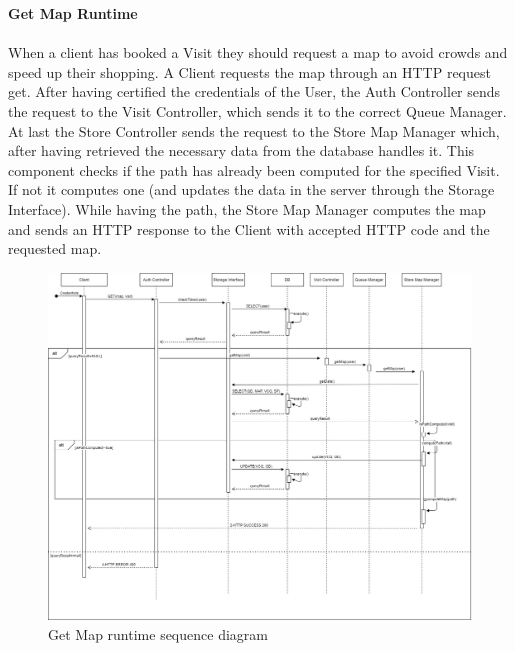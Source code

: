 \documentclass[a4paper, 12pt, oneside, table]{article}
\begin{document}
\textbf{Get Map Runtime}\\
\\
When a client has booked a Visit they should request a map to avoid crowds and speed up their shopping. 
A Client requests the map through an HTTP request get. After having certified the credentials of the User, the Auth Controller sends the request to the Visit Controller, which sends it to the correct Queue Manager. At last the Store Controller sends the request to the Store Map Manager which, after having retrieved the necessary data from the database handles it. This component checks if the path has already been computed for the specified Visit. If not it computes one (and updates the data in the server through the Storage Interface).  While having the path, the Store Map Manager computes the map and sends an HTTP response to the Client with accepted HTTP code and the requested map.
\begin{figure}[H]
\centering
    \centering
    \includegraphics[height=0.5\textheight, scale=0.5, keepaspectratio]{img/seq_diag/GetMap_RuntimeView.jpg}
    \caption{Get Map runtime sequence diagram}
    \label{getMapRunTime}
\end{figure}
\end{document}
